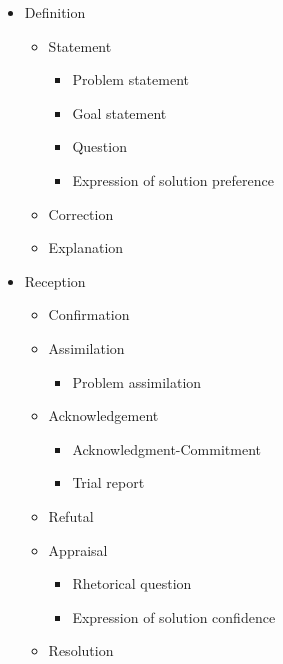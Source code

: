\begin{itemize}
	\item Definition
		\begin{itemize}
			\item Statement
					\begin{itemize}
						\item Problem statement
						\item Goal statement
						\item Question
						\item Expression of solution preference
					\end{itemize}
			\item Correction
			\item Explanation
		\end{itemize}
	\item Reception
		\begin{itemize}
			\item Confirmation
			\item Assimilation
				\begin{itemize}	
					\item Problem assimilation
				\end{itemize}
			\item Acknowledgement
				\begin{itemize}
					\item Acknowledgment-Commitment
					\item Trial report
				\end{itemize}
			\item Refutal
			\item Appraisal
				\begin{itemize}
					\item Rhetorical question
					\item Expression of solution confidence
				\end{itemize}
			\item Resolution
		\end{itemize}
\end{itemize}